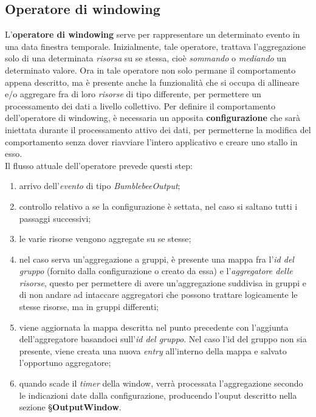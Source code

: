 \subsection{Operatore di windowing}
L'\textbf{operatore di windowing} serve per rappresentare un determinato evento in una data finestra temporale. Inizialmente, tale operatore, trattava l'aggregazione solo di una determinata \textit{risorsa} su se stessa, cioè \textit{sommando} o \textit{mediando} un determinato valore. Ora in tale operatore non solo permane il comportamento appena descritto, ma è presente anche la funzionalità che si occupa di allineare e/o aggregare fra di loro \textit{risorse} di tipo differente, per permettere un processamento dei dati a livello collettivo. Per definire il comportamento dell'operatore di windowing, è necessaria un apposita \textbf{configurazione} che sarà iniettata durante il processamento attivo dei dati, per permetterne la modifica del comportamento senza dover riavviare l'intero applicativo e creare uno stallo in esso.\\
Il flusso attuale dell'operatore prevede questi step:

\begin{enumerate}
	\item{arrivo dell'\textit{evento} di tipo \textit{BumblebeeOutput};}
	\item{controllo relativo a se la configurazione è settata, nel caso si saltano tutti i passaggi successivi;}
	\item{le varie risorse vengono aggregate su se stesse;}
	\item{nel caso serva un'aggregazione a gruppi, è presente una mappa fra l'\textit{id del gruppo} (fornito dalla configurazione o creato da essa) e l'\textit{aggregatore delle risorse}, questo per permettere di avere un'aggregazione suddivisa in gruppi e di non andare ad intaccare aggregatori che possono trattare logicamente le stesse risorse, ma in gruppi differenti;}
	\item{viene aggiornata la mappa descritta nel punto precedente con l'aggiunta dell'aggregatore basandoci sull'\textit{id del gruppo}. Nel caso l'id del gruppo non sia presente, viene creata una nuova \textit{entry} all'interno della mappa e salvato l'opportuno aggregatore;}
	\item{quando scade il \textit{timer} della window, verrà processata l'aggregazione secondo le indicazioni date dalla configurazione, producendo l'ouput descritto nella sezione \S\textbf{OutputWindow}}.
\end{enumerate}

